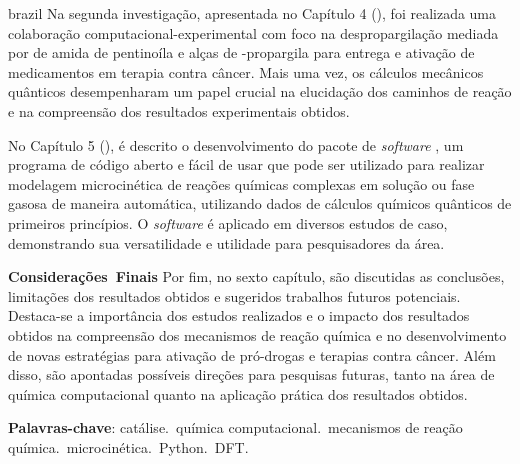 \begin{resumo}
\begin{otherlanguage*}{brazil}
		Na segunda investigação,
		apresentada no Capítulo 4 (),
		foi realizada uma colaboração computacional-experimental com foco na despropargilação mediada por  de amida de pentinoíla e alças de -propargila para entrega e ativação de medicamentos em terapia contra câncer.
		Mais uma vez,
		os cálculos mecânicos quânticos desempenharam um papel crucial na elucidação dos caminhos de reação e na compreensão dos resultados experimentais obtidos.

		No Capítulo 5 (),
		é descrito o desenvolvimento do pacote de \emph{software} \overreact{},
		um programa de código aberto e fácil de usar que pode ser utilizado para realizar modelagem microcinética de reações químicas complexas em solução ou fase gasosa de maneira automática,
		utilizando dados de cálculos químicos quânticos de primeiros princípios.
		O \emph{software} é aplicado em diversos estudos de caso,
		demonstrando sua versatilidade e utilidade para pesquisadores da área.

		\mbox{\textbf{Considerações~Finais}}\linebreak
		Por fim,
		no sexto capítulo,
		são discutidas as conclusões,
		limitações dos resultados obtidos e sugeridos trabalhos futuros potenciais.
		Destaca-se a importância dos estudos realizados e o impacto dos resultados obtidos na compreensão dos mecanismos de reação química e no desenvolvimento de novas estratégias para ativação de pró-drogas e terapias contra câncer.
		Além disso,
		são apontadas possíveis direções para pesquisas futuras,
		tanto na área de química computacional quanto na aplicação prática dos resultados obtidos.

		\vspace{\onelineskip}

		\noindent
		\textbf{Palavras-chave}:
		catálise.\ química computacional.\ mecanismos de reação química.\ microcinética.\ Python.\ DFT.\@
	\end{otherlanguage*}
\end{resumo}

